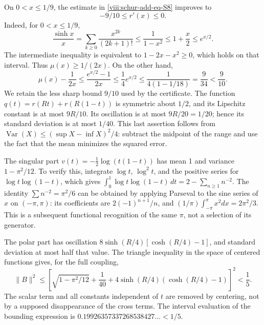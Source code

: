 On \(0<x\leq1/9\), the estimate in \eqref{viii:schur-add-eq-S8} improves to
\begin{equation}
-9/10\leq r'(x)\leq0.
\label{viii:schur-add-display-25}
\end{equation}
Indeed, for \(0<x\leq1/9\),
\begin{equation}
\frac{\sinh x}{x}
=\sum_{k\geq0}\frac{x^{2k}}{(2k+1)!}
\leq\frac1{1-x^2}\leq1+\frac x2\leq e^{x/2}.
\label{viii:schur-add-display-26}
\end{equation}
The intermediate inequality is equivalent to \(1-2x-x^2\geq0\),
which holds on that interval. Thus \(\mu(x)\geq1/(2x)\).
On the other hand,
\begin{equation}
\mu(x)-\frac1{2x}\leq\frac{e^{x/2}-1}{2x}
\leq\frac14 e^{x/2}
\leq\frac1{4(1-1/18)}=\frac9{34}<\frac9{10}.
\label{viii:schur-add-display-27}
\end{equation}
We retain the less sharp bound \(9/10\) used by the certificate.
The function \(q(t)=r(Rt)+r(R(1-t))\) is symmetric about
\(1/2\), and its Lipschitz constant is at most \(9R/10\).
Its oscillation is at most \(9R/20=1/20\); hence its standard
deviation is at most \(1/40\). This last assertion follows from
\(\operatorname{Var}(X)\leq(\sup X-\inf X)^2/4\): subtract the
midpoint of the range and use the fact that the mean minimizes the squared error.

The singular part \(v(t)=-\tfrac12\log(t(1-t))\) has mean 1 and
variance \(1-\pi^2/12\). To verify this, integrate
\(\log t\), \(\log^2t\), and the positive series for
\(\log t\log(1-t)\), which gives
\(\int_0^1\log t\log(1-t)\,dt=2-\sum_{n\geq1}n^{-2}\).
The identity \(\sum n^{-2}=\pi^2/6\) can be obtained by applying Parseval
to the sine series of \(x\) on \((-\pi,\pi)\): its
coefficients are \(2(-1)^{n+1}/n\), and
\((1/\pi)\int_{-\pi}^{\pi}x^2dx=2\pi^2/3\). This is a subsequent
functional recognition of the same \(\pi\), not a selection of its generator.

The polar part has oscillation
\(8\sinh(R/4)[\cosh(R/4)-1]\), and standard deviation at most
half that value. The triangle inequality in the space of centered
functions gives, for the full coupling,
\begin{equation}
\boxed{\|B\|^2\leq
\left[\sqrt{1-\pi^2/12}+\frac1{40}
+4\sinh(R/4)(\cosh(R/4)-1)\right]^2<\frac15.}
\label{viii:schur-add-eq-S12}
\end{equation}
The scalar term and all constants independent of \(t\)
are removed by centering, not by a supposed disappearance of the
cross terms. The interval evaluation of the bounding expression is
\(0.19926357337268538427\ldots<1/5\).

